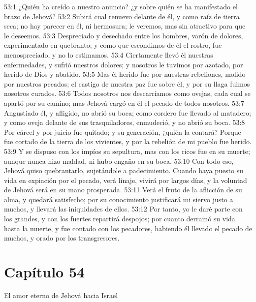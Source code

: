 53:1 ¿Quién ha creído a nuestro anuncio? ¿y sobre quién se ha manifestado el brazo de Jehová? 
53:2 Subirá cual renuevo delante de él, y como raíz de tierra seca; no hay parecer en él, ni hermosura; le veremos, mas sin atractivo para que le deseemos. 
53:3 Despreciado y desechado entre los hombres, varón de dolores, experimentado en quebranto; y como que escondimos de él el rostro, fue menospreciado, y no lo estimamos. 
53:4 Ciertamente llevó él nuestras enfermedades, y sufrió nuestros dolores; y nosotros le tuvimos por azotado, por herido de Dios y abatido. 
53:5 Mas él herido fue por nuestras rebeliones, molido por nuestros pecados; el castigo de nuestra paz fue sobre él, y por su llaga fuimos nosotros curados. 
53:6 Todos nosotros nos descarriamos como ovejas, cada cual se apartó por su camino; mas Jehová cargó en él el pecado de todos nosotros. 
53:7 Angustiado él, y afligido, no abrió su boca; como cordero fue llevado al matadero; y como oveja delante de sus trasquiladores, enmudeció, y no abrió su boca. 
53:8 Por cárcel y por juicio fue quitado; y su generación, ¿quién la contará? Porque fue cortado de la tierra de los vivientes, y por la rebelión de mi pueblo fue herido. 
53:9 Y se dispuso con los impíos su sepultura, mas con los ricos fue en su muerte; aunque nunca hizo maldad, ni hubo engaño en su boca. 
53:10 Con todo eso, Jehová quiso quebrantarlo, sujetándole a padecimiento. Cuando haya puesto su vida en expiación por el pecado, verá linaje, vivirá por largos días, y la voluntad de Jehová será en su mano prosperada. 
53:11 Verá el fruto de la aflicción de su alma, y quedará satisfecho; por su conocimiento justificará mi siervo justo a muchos, y llevará las iniquidades de ellos. 
53:12 Por tanto, yo le daré parte con los grandes, y con los fuertes repartirá despojos; por cuanto derramó su vida hasta la muerte, y fue contado con los pecadores, habiendo él llevado el pecado de muchos, y orado por los transgresores. 
\section*{Capítulo 54 }
El amor eterno de Jehová hacia Israel 
 
